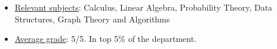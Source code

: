 \begin{itemize}
    \item \underline{Relevant subjects}: Calculus, Linear Algebra, Probability Theory, Data Structures, Graph Theory and Algorithms
    \item \underline{Average grade}: 5/5. In top 5\% of the department.
\end{itemize}
